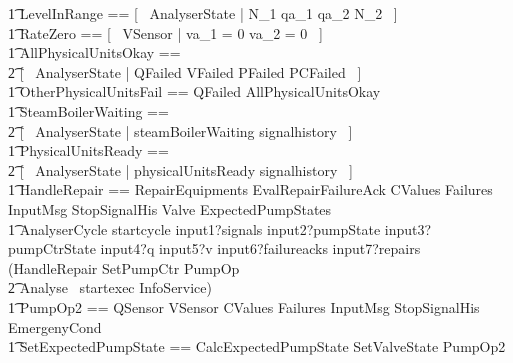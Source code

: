 \documentclass{report} %
\begin{document}
\begin{circus}
    \t1 LevelInRange == [~ AnalyserState | N\_1 \leq qa\_1 \land qa\_2 \leq N\_2 ~] \\
    \t1 RateZero == [~ VSensor | va\_1 = 0 \land va\_2 = 0 ~] \\
    \t1 AllPhysicalUnitsOkay == \\
        \t2 [~ AnalyserState | \lnot QFailed \land \lnot VFailed \land \lnot PFailed \land \lnot PCFailed ~] \\
    \t1 OtherPhysicalUnitsFail == \lnot QFailed \land \lnot AllPhysicalUnitsOkay \\
    \t1 SteamBoilerWaiting == \\
        \t2 [~ AnalyserState | steamBoilerWaiting \in signalhistory ~] \\
    \t1 PhysicalUnitsReady == \\
        \t2 [~ AnalyserState | physicalUnitsReady \in signalhistory ~] \\
    \t1 HandleRepair == RepairEquipments \land EvalRepairFailureAck \land \Xi CValues \land \Xi Failures \land \Xi InputMsg \land \Xi StopSignalHis \land \Xi Valve \land \Xi ExpectedPumpStates \\
    \t1 AnalyserCycle \circdef startcycle \then input1?signals \then input2?pumpState \then input3?pumpCtrState \then input4?q \then input5?v \then input6?failureacks \then input7?repairs \then \\
        (\lschexpract HandleRepair \rschexpract \circseq \lschexpract SetPumpCtr \land PumpOp \rschexpract \circseq \\
            \t2 \lschexpract Analyse \rschexpract \circseq\ startexec \then InfoService) \\
    \t1 PumpOp2 == \Xi QSensor \land \Xi VSensor \land \Xi CValues \land \Xi Failures \land \Xi InputMsg \land \Xi StopSignalHis \land \Xi EmergenyCond \\ %
    \t1 SetExpectedPumpState == CalcExpectedPumpState \land SetValveState \land PumpOp2 \\ %

\end{circus}
\end{document}

